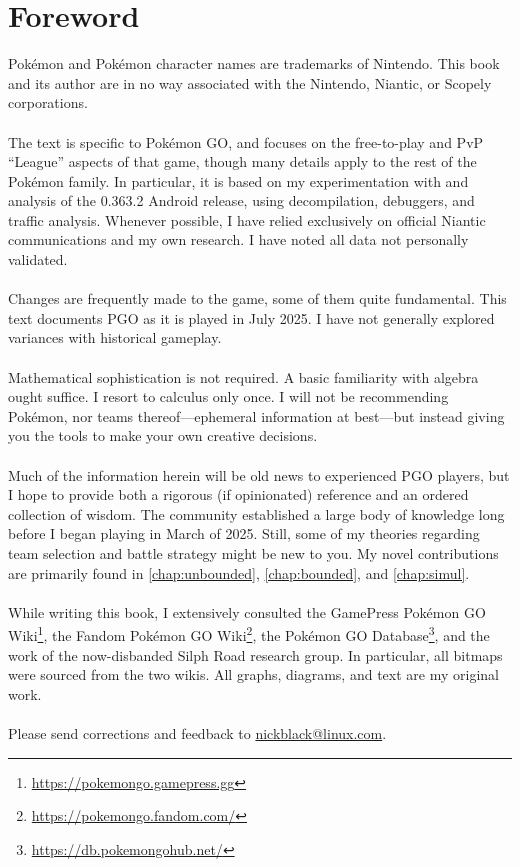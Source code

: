 \clearpage
\chapter{Foreword}

\noindent{}Pokémon and Pokémon character names are trademarks of Nintendo.
This book and its author are in no way associated with the Nintendo, Niantic,
  or Scopely corporations.\\
\\
\noindent{}The text is specific to Pokémon GO, and focuses on the free-to-play and PvP
  ``League'' aspects of that game, though many details
  apply to the rest of the Pokémon family.
In particular, it is based on my experimentation with and analysis of
 the 0.363.2 Android release, using decompilation, debuggers, and
 traffic analysis.
Whenever possible, I have relied exclusively on official Niantic communications
 and my own research.
I have noted all data not personally validated.\\
\\
\noindent{}Changes are frequently made to the game, some of them quite fundamental.
This text documents PGO as it is played in July 2025.
I have not generally explored variances with historical gameplay.\\
\\
\noindent{}Mathematical sophistication is not required.
A basic familiarity with algebra ought suffice.
I resort to calculus only once.
I will not be recommending Pokémon, nor teams thereof---ephemeral information at best---but
 instead giving you the tools to make your own creative decisions.\\
\\
\noindent{}Much of the information herein will be old news to experienced
 PGO players, but I hope to provide both a rigorous (if opinionated) reference and an ordered collection of wisdom.
The community established a large body of knowledge long before I
 began playing in March of 2025.
Still, some of my theories regarding team selection and battle strategy might
  be new to you.
My novel contributions are primarily found in \autoref{chap:unbounded},
  \autoref{chap:bounded}, and \autoref{chap:simul}.\\
\\
\noindent{}While writing this book, I extensively consulted the
  GamePress Pokémon GO Wiki\footnote{\url{https://pokemongo.gamepress.gg}},
  the Fandom Pokémon GO Wiki\footnote{\url{https://pokemongo.fandom.com/}},
  the Pokémon GO Database\footnote{\url{https://db.pokemongohub.net/}},
  and the work of the now-disbanded Silph Road research group.
In particular, all bitmaps were sourced from the two wikis.
All graphs, diagrams, and text are my original work.\\
\\
\noindent{}Please send corrections and feedback to 
  \href{mailto:nickblack@linux.com}{nickblack@linux.com}.
